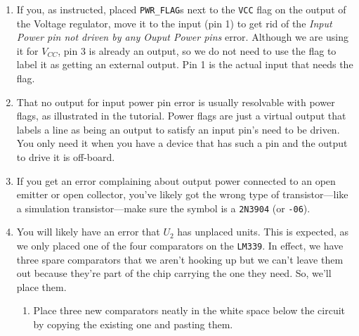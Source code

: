 \documentclass[
  letterpaper,
  DIV=11,
  numbers=noendperiod,
  oneside]{scrartcl}
\providecommand{\tightlist}{%
  \setlength{\itemsep}{0pt}\setlength{\parskip}{0pt}}\usepackage{longtable,booktabs,array}
\begin{document}
\begin{enumerate}
\def\labelenumi{\arabic{enumi}.}
\tightlist
\item
  If you, as instructed, placed \texttt{PWR\_FLAG}s next to the
  \texttt{VCC} flag on the output of the Voltage regulator, move it to
  the input (pin 1) to get rid of the \emph{Input Power pin not driven
  by any Ouput Power pins} error. Although we are using it for
  \(V_{CC}\), pin 3 is already an output, so we do not need to use the
  flag to label it as getting an external output. Pin 1 is the actual
  input that needs the flag.
\item
  That no output for input power pin error is usually resolvable with
  power flags, as illustrated in the tutorial. Power flags are just a
  virtual output that labels a line as being an output to satisfy an
  input pin's need to be driven. You only need it when you have a device
  that has such a pin and the output to drive it is off-board.
\item
  If you get an error complaining about output power connected to an
  open emitter or open collector, you've likely got the wrong type of
  transistor---like a simulation transistor---make sure the symbol is a
  \texttt{2N3904} (or \texttt{-06}).
\item
  You will likely have an error that \(U_2\) has unplaced units. This is
  expected, as we only placed one of the four comparators on the
  \texttt{LM339}. In effect, we have three spare comparators that we
  aren't hooking up but we can't leave them out because they're part of
  the chip carrying the one they need. So, we'll place them.

  \begin{enumerate}
  \def\labelenumii{\alph{enumii}.}
  \tightlist
  \item
    Place three new comparators neatly in the white space below the
    circuit by copying the existing one and pasting them.


\end{enumerate}
\end{enumerate}
\end{document}
